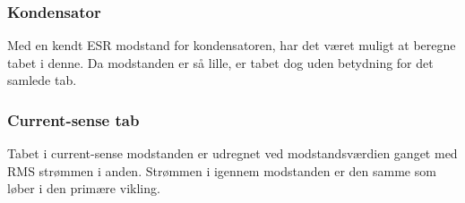 \subsubsection{Kondensator}
Med en kendt ESR modstand for kondensatoren, har det været muligt at beregne tabet i denne. Da modstanden er så lille, er tabet dog uden betydning for det samlede tab.

\subsubsection{Current-sense tab}
Tabet i current-sense modstanden er udregnet ved modstandsværdien ganget med RMS strømmen i anden. Strømmen i igennem modstanden er den samme som løber i den primære vikling. 